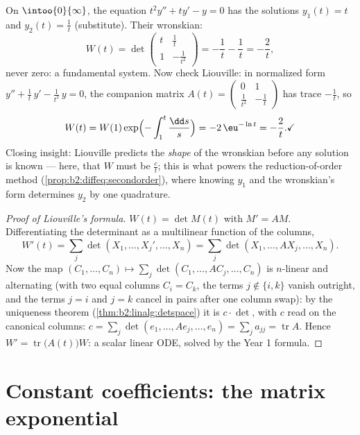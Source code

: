 \begin{example}\label{ex:b2:diffeq:eulerwronskian}
On $\intoo{0}{\infty}$, the equation $t^2y'' + ty' - y = 0$ has
the solutions $y_1(t) = t$ and $y_2(t) = \frac1t$ (substitute).
Their wronskian:
\[
W(t) = \det\begin{pmatrix} t & \tfrac1t\\[2pt]
1 & -\tfrac{1}{t^2}\end{pmatrix}
= -\frac1t - \frac1t = -\frac2t ,
\]
never zero: a fundamental system. Now check Liouville: in
normalized form $y'' + \frac1t\,y' - \frac{1}{t^2}\,y = 0$, the
companion matrix $A(t) = \begin{pmatrix} 0 & 1\\ \frac{1}{t^2}
& -\frac1t\end{pmatrix}$ has trace $-\frac1t$, so
\[
W(t) = W(1)\exp\Bigl(-\int_1^t\frac{\dd s}{s}\Bigr)
= -2\,\eu^{-\ln t} = -\frac2t . \checkmark
\]
Closing insight: Liouville predicts the \emph{shape} of the
wronskian before any solution is known --- here, that $W$ must
be $\frac{c}{t}$; this is what powers the
reduction-of-order method
(\cref{prop:b2:diffeq:secondorder}), where knowing $y_1$ and
the wronskian's form determines $y_2$ by one quadrature.
\end{example}

\begin{proof}[Proof of Liouville's formula]
$W(t) = \det M(t)$ with $M' = AM$. Differentiating the determinant
as a multilinear function of the columns,
\[
W'(t) = \sum_j \det(X_1, \dots, X_j', \dots, X_n)
= \sum_j \det(X_1, \dots, AX_j, \dots, X_n) .
\]
Now the map $(C_1, \dots, C_n) \mapsto \sum_j \det(C_1, \dots,
AC_j, \dots, C_n)$ is $n$-linear and alternating (with two equal
columns $C_i = C_k$, the terms $j \notin \{i, k\}$ vanish outright,
and the terms $j = i$ and $j = k$ cancel in pairs after one column
swap): by the uniqueness theorem
(\cref{thm:b2:linalg:detspace}) it is $c \cdot \det$, with $c$ read
on the canonical columns: $c = \sum_j \det(e_1, \dots, Ae_j, \dots,
e_n) = \sum_j a_{jj} = \operatorname{tr} A$. Hence $W' =
\operatorname{tr}\bigl(A(t)\bigr)W$: a scalar linear ODE, solved by
the Year 1 formula.
\end{proof}

\section{Constant coefficients: the matrix exponential}


